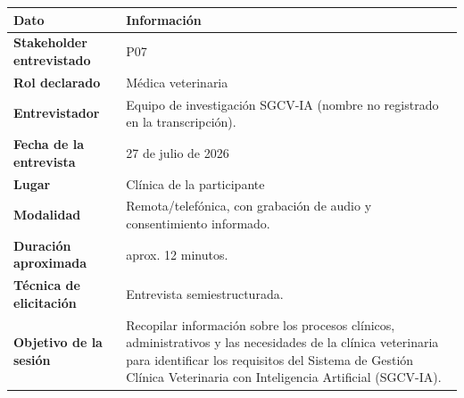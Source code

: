 \documentclass[
]{article}
\newcounter{none} %
\begin{document}
{\def\LTcaptype{none} %
\begin{longtable}[]{|
  >{\raggedright\arraybackslash}p{}|
  >{\raggedright\arraybackslash}p{}|}
\hline
\begin{minipage}[b]{\linewidth}\centering
\textbf{Dato}
\end{minipage} & \begin{minipage}[b]{\linewidth}\centering
\textbf{Información}
\end{minipage} \\
\hline
\endhead
\hline
\endlastfoot
\textbf{Stakeholder entrevistado} & \begin{minipage}[t]{\linewidth}\raggedright
P07
\end{minipage} \\
\hline
\textbf{Rol declarado} & \begin{minipage}[t]{\linewidth}\raggedright
Médica veterinaria
\end{minipage} \\
\hline
\textbf{Entrevistador} & \begin{minipage}[t]{\linewidth}\raggedright
Equipo de investigación SGCV-IA (nombre no registrado en la transcripción).
\end{minipage} \\
\hline
\textbf{Fecha de la entrevista} & \begin{minipage}[t]{\linewidth}\raggedright
27 de julio de 2026
\end{minipage} \\
\hline
\textbf{Lugar} & \begin{minipage}[t]{\linewidth}\raggedright
Clínica de la participante
\end{minipage} \\
\hline
\textbf{Modalidad} & \begin{minipage}[t]{\linewidth}\raggedright
Remota/telefónica, con grabación de audio y consentimiento informado.
\end{minipage} \\
\hline
\textbf{Duración aproximada} & \begin{minipage}[t]{\linewidth}\raggedright
aprox. 12 minutos.
\end{minipage} \\
\hline
\textbf{Técnica de elicitación} & \begin{minipage}[t]{\linewidth}\raggedright
Entrevista semiestructurada.
\end{minipage} \\
\hline
\textbf{Objetivo de la sesión} & \begin{minipage}[t]{\linewidth}\raggedright
Recopilar información sobre los procesos clínicos, administrativos y las necesidades de la clínica veterinaria para identificar los requisitos del Sistema de Gestión Clínica Veterinaria con Inteligencia Artificial (SGCV-IA).
\end{minipage} \\
\hline
\end{longtable}
}
\end{document}
